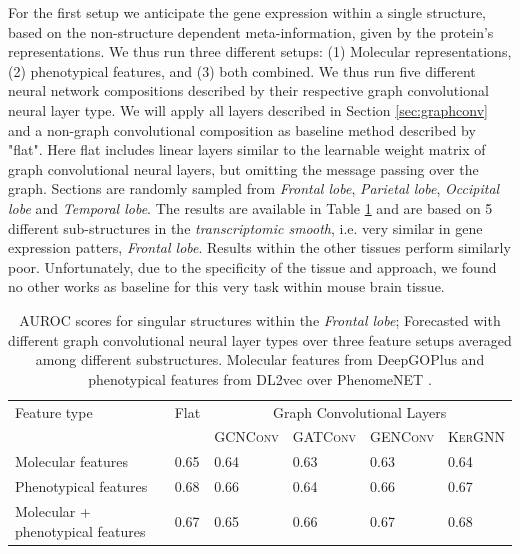 \documentclass[]{article}
\renewcommand{\cite}{\citep}
\begin{document}
For the first setup we anticipate the gene expression within a single structure, based on the non-structure dependent meta-information, given by the protein's representations. We thus run three different setups: (1) Molecular representations, (2) phenotypical features, and (3) both combined. We thus run five different neural network compositions described by their respective graph convolutional neural layer type. We will apply all layers described in Section \ref{sec:graphconv} and a non-graph convolutional composition as baseline method described by "flat". Here flat includes linear layers similar to the learnable weight matrix of graph convolutional neural layers, but omitting the message passing over the graph. Sections are randomly sampled from \textit{Frontal lobe}, \textit{Parietal lobe}, \textit{Occipital lobe } and \textit{Temporal lobe}. The results are available in Table \ref{tab:geneexp_pred} and are based on 5 different sub-structures in the \textit{transcriptomic smooth}, i.e. very similar in gene expression patters, \textit{Frontal lobe}. Results within the other tissues perform similarly poor. Unfortunately, due to the specificity of the tissue and approach, we found no other works as baseline for this very task within mouse brain tissue.

\begin{table}
	\centering
	\renewcommand{\arraystretch}{1.5}
	\begin{tabular}{|l|l|llll|}
		\hline
		Feature type&Flat&\multicolumn{4}{|c}{Graph Convolutional Layers}\\
		&&\multicolumn{1}{|l}{\textsc{GCNConv}}&\textsc{GATConv}&\textsc{GENConv}&\textsc{KerGNN}\\
		\hline
		Molecular features&0.65&0.64&0.63&0.63&0.64\\
		Phenotypical features&0.68&0.66&0.64&0.66&0.67\\
		Molecular + phenotypical features &0.67&0.65&0.66&0.67&0.68\\
		\hline
	\end{tabular}

	\caption{AUROC scores for singular structures within the \textit{Frontal lobe}; Forecasted with different graph convolutional neural layer types over three feature setups averaged among different substructures. Molecular features from DeepGOPlus \cite{DeepGoPlus} and phenotypical features from DL2vec \cite{DL2vec2020} over PhenomeNET \cite{PhenomeNET2011}. }
	\label{tab:geneexp_pred}
\end{table}
\end{document}
